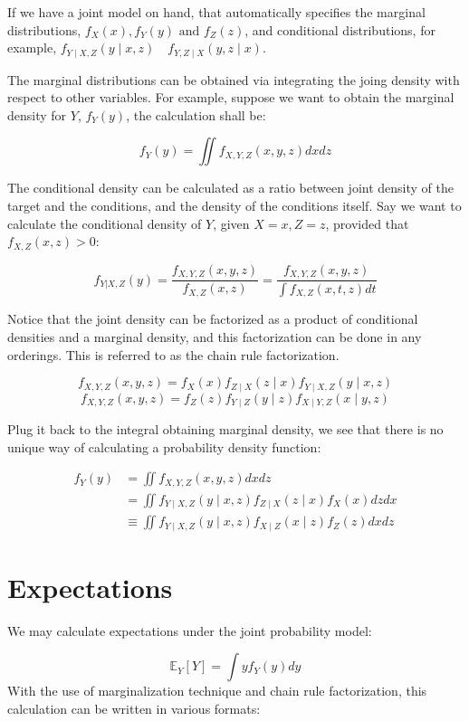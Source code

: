 \documentclass[
]{book}
\begin{document}
If we have a joint model on hand, that automatically specifies the marginal distributions, \(f_X(x), f_Y(y) \text { and } f_Z(z)\), and conditional distributions, for example, \(f_{Y \mid X, Z}(y \mid x, z) \quad f_{Y, Z \mid X}(y, z \mid x)\).

The marginal distributions can be obtained via integrating the joing density with respect to other variables. For example, suppose we want to obtain the marginal density for \(Y\), \(f_Y(y)\), the calculation shall be:

\[
f_Y(y) = \iint f_{X, Y, Z}(x, y, z) d x d z 
\]

The conditional density can be calculated as a ratio between joint density of the target and the conditions, and the density of the conditions itself. Say we want to calculate the conditional density of \(Y\), given \(X=x, Z=z\), provided that \(f_{X,Z}(x,z) > 0\):

\[ f_{Y|X,Z}(y) = \frac{f_{X,Y,Z}(x,y,z)}{f_{X,Z}(x,z) } = \frac{f_{X,Y,Z}(x,y,z)}{\int f_{X,Z}(x,t,z) dt}\]

Notice that the joint density can be factorized as a product of conditional densities and a marginal density, and this factorization can be done in any orderings. This is referred to as the chain rule factorization.

\[ f_{X, Y, Z}(x, y, z)=f_X(x) f_{Z \mid X}(z \mid x) f_{Y \mid X, Z}(y \mid x, z) \] \[ f_{X, Y, Z}(x, y, z)=f_Z(z) f_{Y \mid Z}(y \mid z) f_{X \mid Y, Z}(x \mid y, z) \]

Plug it back to the integral obtaining marginal density, we see that there is no unique way of calculating a probability density function:

\[ \begin{aligned}
f_Y(y) & =\iint f_{X, Y, Z}(x, y, z) d x d z \\
& =\iint f_{Y \mid X, Z}(y \mid x, z) f_{Z \mid X}(z \mid x) f_X(x) d z d x \\
& \equiv \iint f_{Y \mid X, Z}(y \mid x, z) f_{X \mid Z}(x \mid z) f_Z(z) d x d z
\end{aligned} \]

\hypertarget{expectations}{%
\section{Expectations}\label{expectations}}

We may calculate expectations under the joint probability model:

\[ \mathbb{E}_Y[Y] = \int yf_Y(y) dy\] With the use of marginalization technique and chain rule factorization, this calculation can be written in various formats:
\end{document}
